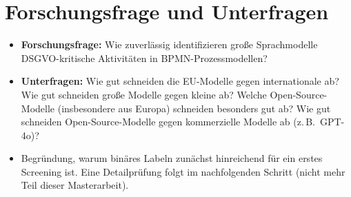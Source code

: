 \section{Forschungsfrage und Unterfragen}\label{sec:forschungsfrage-und-unterfragen}
\begin{itemize}
    \item \textbf{Forschungsfrage:} Wie zuverlässig identifizieren große Sprachmodelle DSGVO-kritische Aktivitäten in BPMN-Prozessmodellen?
    \item \textbf{Unterfragen:} Wie gut schneiden die EU-Modelle gegen internationale ab? Wie gut schneiden große Modelle gegen kleine ab? Welche Open-Source-Modelle (insbesondere aus Europa) schneiden besonders gut ab? Wie gut schneiden Open-Source-Modelle gegen kommerzielle Modelle ab (z.\,B.\ GPT-4o)?
    \item Begründung, warum binäres Labeln zunächst hinreichend für ein erstes Screening ist. Eine Detailprüfung folgt im nachfolgenden Schritt (nicht mehr Teil dieser Masterarbeit).
\end{itemize}